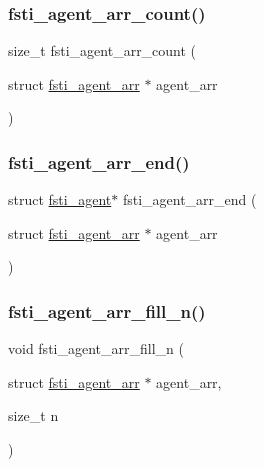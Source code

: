 \subsubsection{\texorpdfstring{fsti\+\_\+agent\+\_\+arr\+\_\+count()}{fsti\_agent\_arr\_count()}}
{\footnotesize\ttfamily size\+\_\+t fsti\+\_\+agent\+\_\+arr\+\_\+count (\begin{DoxyParamCaption}\item[{struct \mbox{\hyperlink{structfsti__agent__arr}{fsti\+\_\+agent\+\_\+arr}} $\ast$}]{agent\+\_\+arr }\end{DoxyParamCaption})\hspace{0.3cm}{\ttfamily [inline]}}

\mbox{\label{fsti-agent_8c_a1a5fc4621ece587a603b9b970bc3bd7c}} 
\subsubsection{\texorpdfstring{fsti\+\_\+agent\+\_\+arr\+\_\+end()}{fsti\_agent\_arr\_end()}}
{\footnotesize\ttfamily struct \mbox{\hyperlink{structfsti__agent}{fsti\+\_\+agent}}$\ast$ fsti\+\_\+agent\+\_\+arr\+\_\+end (\begin{DoxyParamCaption}\item[{struct \mbox{\hyperlink{structfsti__agent__arr}{fsti\+\_\+agent\+\_\+arr}} $\ast$}]{agent\+\_\+arr }\end{DoxyParamCaption})}

\mbox{\label{fsti-agent_8c_a87de33f5c064440c162d0c8d0f9ccbf8}} 
\subsubsection{\texorpdfstring{fsti\+\_\+agent\+\_\+arr\+\_\+fill\+\_\+n()}{fsti\_agent\_arr\_fill\_n()}}
{\footnotesize\ttfamily void fsti\+\_\+agent\+\_\+arr\+\_\+fill\+\_\+n (\begin{DoxyParamCaption}\item[{struct \mbox{\hyperlink{structfsti__agent__arr}{fsti\+\_\+agent\+\_\+arr}} $\ast$}]{agent\+\_\+arr,  }\item[{size\+\_\+t}]{n }\end{DoxyParamCaption})}

